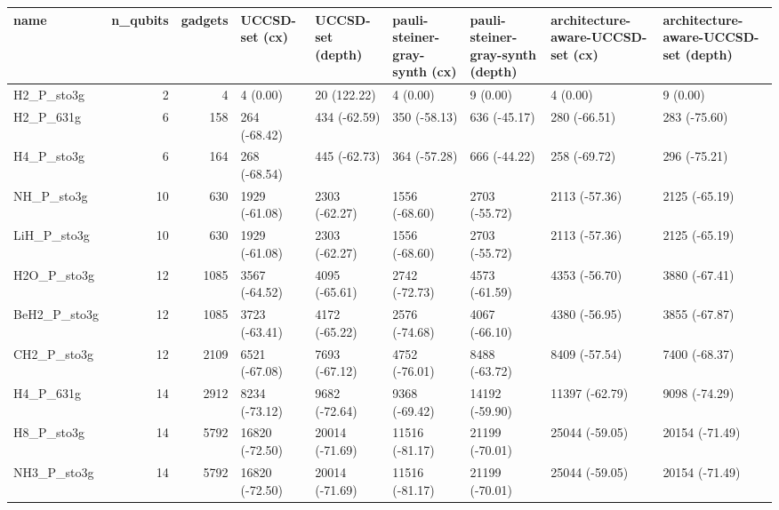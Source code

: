 \begin{tabular}{lrrllllll}
\toprule
name & n\_qubits & gadgets & UCCSD-set (cx) & UCCSD-set (depth) & pauli-steiner-gray-synth (cx) & pauli-steiner-gray-synth (depth) & architecture-aware-UCCSD-set (cx) & architecture-aware-UCCSD-set (depth) \\
\midrule
H2\_P\_sto3g & 2 & 4 & 4 (0.00) & 20 (122.22) & 4 (0.00) & 9 (0.00) & 4 (0.00) & 9 (0.00) \\
H2\_P\_631g & 6 & 158 & 264 (-68.42) & 434 (-62.59) & 350 (-58.13) & 636 (-45.17) & 280 (-66.51) & 283 (-75.60) \\
H4\_P\_sto3g & 6 & 164 & 268 (-68.54) & 445 (-62.73) & 364 (-57.28) & 666 (-44.22) & 258 (-69.72) & 296 (-75.21) \\
NH\_P\_sto3g & 10 & 630 & 1929 (-61.08) & 2303 (-62.27) & 1556 (-68.60) & 2703 (-55.72) & 2113 (-57.36) & 2125 (-65.19) \\
LiH\_P\_sto3g & 10 & 630 & 1929 (-61.08) & 2303 (-62.27) & 1556 (-68.60) & 2703 (-55.72) & 2113 (-57.36) & 2125 (-65.19) \\
H2O\_P\_sto3g & 12 & 1085 & 3567 (-64.52) & 4095 (-65.61) & 2742 (-72.73) & 4573 (-61.59) & 4353 (-56.70) & 3880 (-67.41) \\
BeH2\_P\_sto3g & 12 & 1085 & 3723 (-63.41) & 4172 (-65.22) & 2576 (-74.68) & 4067 (-66.10) & 4380 (-56.95) & 3855 (-67.87) \\
CH2\_P\_sto3g & 12 & 2109 & 6521 (-67.08) & 7693 (-67.12) & 4752 (-76.01) & 8488 (-63.72) & 8409 (-57.54) & 7400 (-68.37) \\
H4\_P\_631g & 14 & 2912 & 8234 (-73.12) & 9682 (-72.64) & 9368 (-69.42) & 14192 (-59.90) & 11397 (-62.79) & 9098 (-74.29) \\
H8\_P\_sto3g & 14 & 5792 & 16820 (-72.50) & 20014 (-71.69) & 11516 (-81.17) & 21199 (-70.01) & 25044 (-59.05) & 20154 (-71.49) \\
NH3\_P\_sto3g & 14 & 5792 & 16820 (-72.50) & 20014 (-71.69) & 11516 (-81.17) & 21199 (-70.01) & 25044 (-59.05) & 20154 (-71.49) \\
\bottomrule
\end{tabular}

